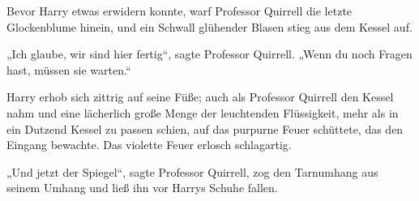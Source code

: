 Bevor Harry etwas erwidern konnte, warf Professor Quirrell die letzte Glockenblume hinein, und ein Schwall glühender Blasen stieg aus dem Kessel auf.

„Ich glaube, wir sind hier fertig“, sagte Professor Quirrell.
„Wenn du noch Fragen hast, müssen sie warten.“

Harry erhob sich zittrig auf seine Füße; auch als Professor Quirrell den Kessel nahm und eine lächerlich große Menge der leuchtenden Flüssigkeit, mehr als in ein Dutzend Kessel zu passen schien, auf das purpurne Feuer schüttete, das den Eingang bewachte.
%
Das violette Feuer erlosch schlagartig.

„Und jetzt der Spiegel“, sagte Professor Quirrell, zog den Tarnumhang aus seinem Umhang und ließ ihn vor Harrys Schuhe fallen.


